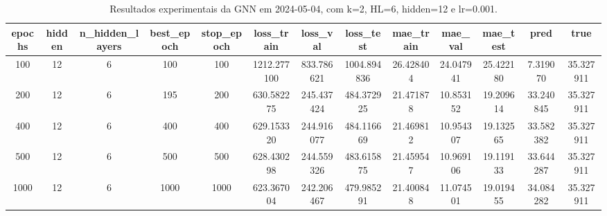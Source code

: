 \begin{table}[h]
\centering
\caption{Resultados experimentais da GNN em 2024-05-04, com k=2, HL=6, hidden=12 e lr=0.001.}
\label{tab:gnn_results_k2_hl6_h12_d20240504}
\begin{tabular}{ccccccccccccc}
\toprule
epochs & hidden & n\_hidden\_layers & best\_epoch & stop\_epoch & loss\_train & loss\_val & loss\_test & mae\_train & mae\_val & mae\_test & pred & true \\
\midrule
100 & 12 & 6 & 100 & 100 & 1212.277100 & 833.786621 & 1004.894836 & 26.428404 & 24.047941 & 25.422180 & 7.319070 & 35.327911 \\
200 & 12 & 6 & 195 & 200 & 630.582275 & 245.437424 & 484.372925 & 21.471878 & 10.853152 & 19.209614 & 33.240845 & 35.327911 \\
400 & 12 & 6 & 400 & 400 & 629.153320 & 244.916077 & 484.116669 & 21.469812 & 10.954307 & 19.132565 & 33.582382 & 35.327911 \\
500 & 12 & 6 & 500 & 500 & 628.430298 & 244.559326 & 483.615875 & 21.459547 & 10.969106 & 19.119133 & 33.644287 & 35.327911 \\
1000 & 12 & 6 & 1000 & 1000 & 623.367004 & 242.206467 & 479.985291 & 21.400848 & 11.074501 & 19.019455 & 34.084282 & 35.327911 \\
\bottomrule
\end{tabular}
\end{table}
